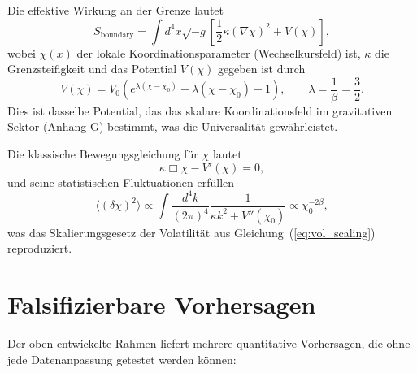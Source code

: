 \documentclass[12pt,a4paper]{article}
\theoremstyle{remark}
\begin{document}
	Die effektive Wirkung an der Grenze lautet
	\begin{equation}
		S_{\mathrm{boundary}} = \int d^4x \sqrt{-g} \left[ \frac{1}{2} \kappa (\nabla \chi)^2 + V(\chi) \right],
		\label{eq:action}
	\end{equation}
	wobei \(\chi(x)\) der lokale Koordinationsparameter (Wechselkursfeld) ist, \(\kappa\) die Grenzsteifigkeit und das Potential \(V(\chi)\) gegeben ist durch
	\begin{equation}
		V(\chi) = V_0 \left( e^{\lambda(\chi - \chi_0)} - \lambda(\chi - \chi_0) - 1 \right), \qquad \lambda = \frac{1}{\beta} = \frac{3}{2}.
		\label{eq:potential}
	\end{equation}
	Dies ist dasselbe Potential, das das skalare Koordinationsfeld im gravitativen Sektor (Anhang G) bestimmt, was die Universalität gewährleistet.
	
	Die klassische Bewegungsgleichung für \(\chi\) lautet
	\begin{equation}
		\kappa \Box \chi - V'(\chi) = 0,
		\label{eq:eom}
	\end{equation}
	und seine statistischen Fluktuationen erfüllen
	\begin{equation}
		\langle (\delta \chi)^2 \rangle \propto \int \frac{d^4k}{(2\pi)^4} \frac{1}{\kappa k^2 + V''(\chi_0)} \propto \chi_0^{-2\beta},
		\label{eq:fluctuations}
	\end{equation}
	was das Skalierungsgesetz der Volatilität aus Gleichung~(\ref{eq:vol_scaling}) reproduziert.
	
	\section{Falsifizierbare Vorhersagen}
	
	Der oben entwickelte Rahmen liefert mehrere quantitative Vorhersagen, die ohne jede Datenanpassung getestet werden können:
	
\end{document}
